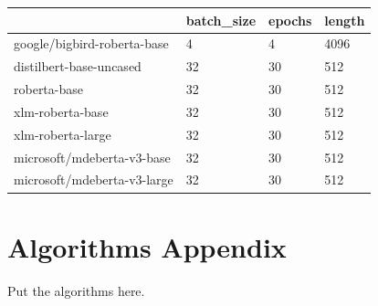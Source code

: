 \documentclass[11pt]{article}
\begin{document}
	\begin{table}[]
		\begin{tabular}{@{}l|lll@{}}
			\toprule
			& \multicolumn{1}{l|}{batch\_size} & \multicolumn{1}{l|}{epochs} & \multicolumn{1}{l|}{length} \\ \midrule
			\multicolumn{1}{|l|}{google/bigbird-roberta-base} & 4                                & 4                           & 4096                             \\ \cmidrule(r){1-1}
			\multicolumn{1}{|l|}{distilbert-base-uncased}     & 32                               & 30                          & 512                              \\ \cmidrule(r){1-1}
			\multicolumn{1}{|l|}{roberta-base}                & 32                               & 30                          & 512                              \\ \cmidrule(r){1-1}
			\multicolumn{1}{|l|}{xlm-roberta-base}            & 32                               & 30                          & 512                              \\ \cmidrule(r){1-1}
			\multicolumn{1}{|l|}{xlm-roberta-large}           & 32                               & 30                          & 512                              \\ \cmidrule(r){1-1}
			\multicolumn{1}{|l|}{microsoft/mdeberta-v3-base}  & 32                               & 30                          & 512                              \\ \cmidrule(r){1-1}
			\multicolumn{1}{|l|}{microsoft/mdeberta-v3-large} & 32                               & 30                          & 512                              \\ \bottomrule
		\end{tabular}
	\end{table}
	
	\section{Algorithms  Appendix}
	\label{sec:appendix}
	
	Put the algorithms here.
\end{document}
